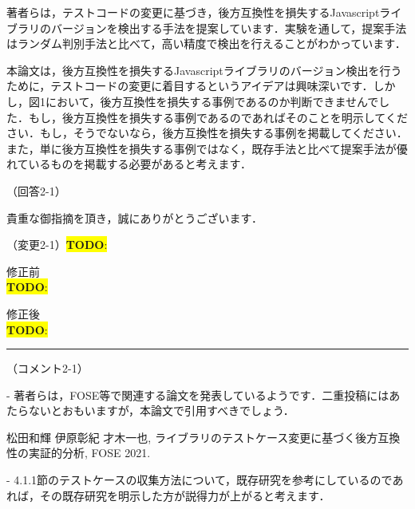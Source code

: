 \documentclass{jarticle} %
\newcommand{\todo}[1]{\colorbox{yellow}{{\bf TODO}:}{\color{red}{\textbf{[#1]}}}}
\def\subsection#1{ \vspace{1pc} {\gt #1} }
\def\nextans{ \vspace{2pc} \hrule }
\begin{document}
著者らは，テストコードの変更に基づき，後方互換性を損失するJavascriptライブラリのバージョンを検出する手法を提案しています．実験を通して，提案手法はランダム判別手法と比べて，高い精度で検出を行えることがわかっています．

本論文は，後方互換性を損失するJavascriptライブラリのバージョン検出を行うために，テストコードの変更に着目するというアイデアは興味深いです．しかし，図1において，後方互換性を損失する事例であるのか判断できませんでした．もし，後方互換性を損失する事例であるのであればそのことを明示してください．もし，そうでないなら，後方互換性を損失する事例を掲載してください．また，単に後方互換性を損失する事例ではなく，既存手法と比べて提案手法が優れているものを掲載する必要があると考えます．


\subsection{（回答2-1）}

貴重な御指摘を頂き，誠にありがとうございます．


\subsection{（変更2-1）\todo{hoge}}
\vspace{-0.3cm}
\begin{description}
\item 修正前\\
\phantom{　}
\todo{hoge}
\vspace{-0.3cm}
\item 修正後\\
\phantom{　}
\todo{hoge}
\end{description}


\newpage
\nextans
\subsection{（コメント2-1）}

- 著者らは，FOSE等で関連する論文を発表しているようです．二重投稿にはあたらないとおもいますが，本論文で引用すべきでしょう．

松田和輝 伊原彰紀 才木一也, ライブラリのテストケース変更に基づく後方互換性の実証的分析, FOSE 2021.

- 4.1.1節のテストケースの収集方法について，既存研究を参考にしているのであれば，その既存研究を明示した方が説得力が上がると考えます．
\end{document}

